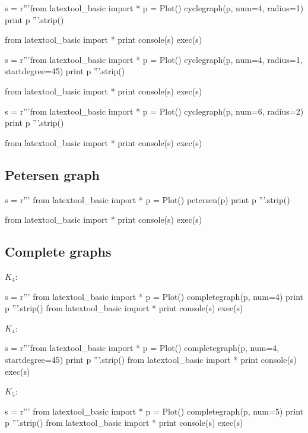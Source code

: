 \begin{python}
s = r'''from latextool_basic import *
p = Plot()
cyclegraph(p, num=4, radius=1)
print p
'''.strip()

from latextool_basic import *
print console(s)
exec(s)
\end{python}
  
\begin{python}
s = r'''from latextool_basic import *
p = Plot()
cyclegraph(p, num=4, radius=1, startdegree=45)
print p
'''.strip()

from latextool_basic import *
print console(s)
exec(s)
\end{python}
  

\begin{python}
s = r'''from latextool_basic import *
p = Plot()
cyclegraph(p, num=6, radius=2)
print p
'''.strip()

from latextool_basic import *
print console(s)
exec(s)
\end{python}




\newpage
\subsection{Petersen graph}
\begin{python}
s = r'''
from latextool_basic import *
p = Plot()
petersen(p)
print p
'''.strip()

from latextool_basic import *
print console(s)
exec(s)
\end{python}




\newpage
\subsection{Complete graphs}

$K_4$:
\begin{python}
s = r'''
from latextool_basic import *
p = Plot()
completegraph(p, num=4)
print p
'''.strip()
from latextool_basic import *
print console(s)
exec(s)
\end{python}

$K_4$:
\begin{python}
s = r'''from latextool_basic import *
p = Plot()
completegraph(p, num=4, startdegree=45)
print p
'''.strip()
from latextool_basic import *
print console(s)
exec(s)
\end{python}


$K_5$:
\begin{python}
s = r'''
from latextool_basic import *
p = Plot()
completegraph(p, num=5)
print p
'''.strip()
from latextool_basic import *
print console(s)
exec(s)
\end{python}
  
